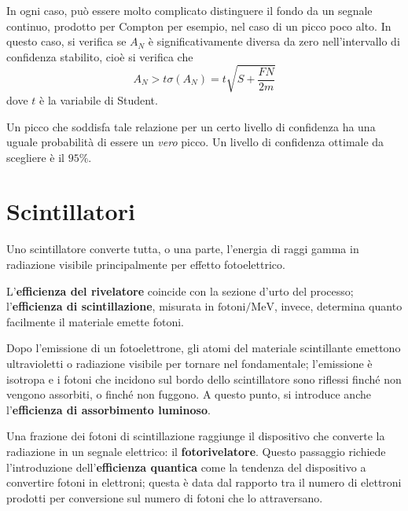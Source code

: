\documentclass[11pt, a4paper]{scrartcl}
\theoremstyle{style}
\newenvironment{boxenv}[1][]{
    \begin{eqbox}[#1]
    }{
   \end{eqbox}
}
\numberwithin{equation}{subsection}
\begin{document}
In ogni caso, pu\`o essere molto complicato distinguere il fondo da un segnale continuo, prodotto per Compton per esempio, nel caso di un picco poco alto.
In questo caso, si verifica se $A_N$ \`e significativamente diversa da zero nell'intervallo di confidenza stabilito, cio\`e si verifica che
\begin{equation}
	A_N > t \sigma (A_N) = t \sqrt{S+ \frac{FN}{2m}} 
\end{equation}
dove $t$ \`e la variabile di Student.
\begin{boxenv}[]
Un picco che soddisfa tale relazione per un certo livello di confidenza ha una uguale probabilit\`a di essere un \textit{vero} picco.
Un livello di confidenza ottimale da scegliere \`e il $95\%$.
\end{boxenv}

\newpage

\section{Scintillatori}

Uno scintillatore converte tutta, o una parte, l'energia di raggi gamma in radiazione visibile principalmente per effetto fotoelettrico.

L'\textbf{efficienza del rivelatore} coincide con la sezione d'urto del processo; l'\textbf{efficienza di scintillazione}, misurata in $\text{fotoni}/\text{MeV}$, invece, determina quanto facilmente il materiale emette fotoni.

Dopo l'emissione di un fotoelettrone, gli atomi del materiale scintillante emettono ultravioletti o radiazione visibile per tornare nel fondamentale; l'emissione \`e isotropa e i fotoni che incidono sul bordo dello scintillatore sono riflessi finch\'e non vengono assorbiti, o finch\'e non fuggono.
A questo punto, si introduce anche l'\textbf{efficienza di assorbimento luminoso}.

Una frazione dei fotoni di scintillazione raggiunge il dispositivo che converte la radiazione in un segnale elettrico: il \textbf{fotorivelatore}.
Questo passaggio richiede l'introduzione dell'\textbf{efficienza quantica} come la tendenza del dispositivo a convertire fotoni in elettroni; questa \`e data dal rapporto tra il numero di elettroni prodotti per conversione sul numero di fotoni che lo attraversano.
\end{document}
